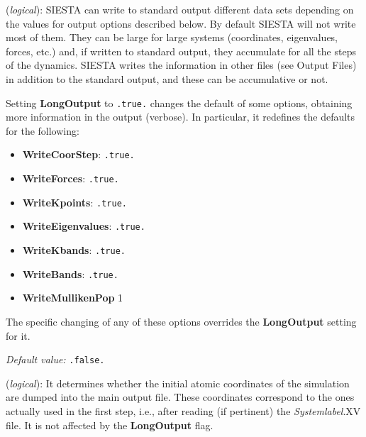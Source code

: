 \begin{description}
\itemsep 10pt
\parsep 0pt

\item[{\bf LongOutput}] ({\it logical}):
SIESTA can write to standard output different data sets
depending on the values for output options described below.
By default SIESTA will not write most of them. They can be
large for large systems (coordinates, eigenvalues, forces, etc.)
and, if written to standard output, they accumulate for all the steps of 
the dynamics. SIESTA writes the information in other files
(see Output Files) in addition to the standard output, and these
can be accumulative or not.

Setting {\bf LongOutput} to {\tt .true.} changes the default of
some options, obtaining more information in the output (verbose).
In particular, it redefines the defaults for the following:

\begin{itemize}

\item
{\bf WriteCoorStep}:
 {\tt .true.}
\item
{\bf WriteForces}:
 {\tt .true.}
\item
{\bf WriteKpoints}:
 {\tt .true.}
\item
{\bf WriteEigenvalues}:
 {\tt .true.}
\item
{\bf WriteKbands}:
 {\tt .true.}
\item
{\bf WriteBands}:
 {\tt .true.}
\item
{\bf WriteMullikenPop} 
 1

\end{itemize}

The specific changing of any of these options overrides the
{\bf LongOutput} setting for it.

{\it Default value:} {\tt .false.}


\item[{\bf WriteCoorInitial}] ({\it logical}):
It determines whether the initial atomic coordinates of the simulation are
dumped into the main output file. These coordinates correspond to the
ones actually used in the first step, i.e., after reading (if pertinent)
the {\it Systemlabel}.XV file. It is not affected by the {\bf LongOutput}
flag.


\end{description}
